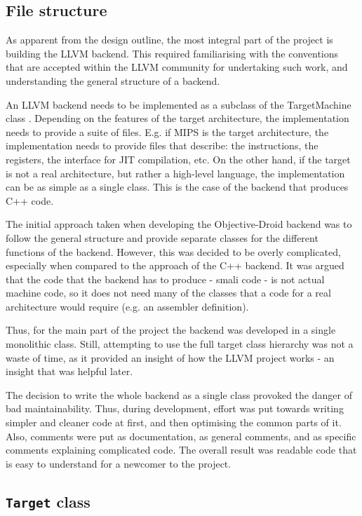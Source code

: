 \documentclass[parskip]{cs4rep}
\begin{document}
\subsection{File structure}

As apparent from the design outline, the most integral part of the project is building the LLVM backend. This required familiarising with the conventions that are accepted within the LLVM community for undertaking such work, and understanding the general structure of a backend.

An LLVM backend needs to be implemented as a subclass of the TargetMachine class \cite{P8}. Depending on the features of the target architecture, the implementation needs to provide a suite of files. E.g. if MIPS is the target architecture, the implementation needs to provide files that describe: the instructions, the registers, the interface for JIT compilation, etc. On the other hand, if the target is not a real architecture, but rather a high-level language, the implementation can be as simple as a single class. This is the case of the backend that produces C++ code.

The initial approach taken when developing the Objective-Droid backend was to follow the general structure and provide separate classes for the different functions of the backend. However, this was decided to be overly complicated, especially when compared to the approach of the C++ backend. It was argued that the code that the backend has to produce - smali code - is not actual machine code, so it does not need many of the classes that a code for a real architecture would require (e.g. an assembler definition).

Thus, for the main part of the project the backend was developed in a single monolithic class. Still, attempting to use the full target class hierarchy was not a waste of time, as it provided an insight of how the LLVM project works - an insight that was helpful later.

The decision to write the whole backend as a single class provoked the danger of bad maintainability. Thus, during development, effort was put towards writing simpler and cleaner code at first, and then optimising the common parts of it. Also, comments were put as documentation, as general comments, and as specific comments explaining complicated code. The overall result was readable code that is easy to understand for a newcomer to the project.

\subsection{{\tt Target} class}
\end{document}
